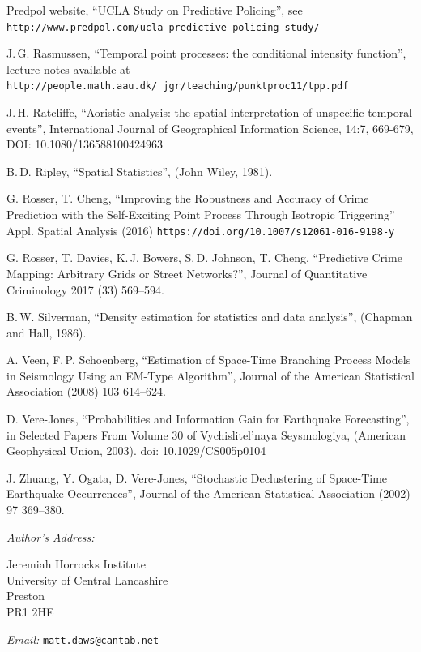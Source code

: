 \documentclass[twoside,a4paper]{article}
\theoremstyle{plain}
\theoremstyle{definition}
\begin{document}
\begin{thebibliography}{99}
 Predpol website, ``UCLA Study on Predictive Policing'',
	see \texttt{http://www.predpol.com/ucla-predictive-policing-study/}

 J.\,G. Rasmussen,
	``Temporal point processes: the conditional intensity function'',
	lecture notes available at \texttt{http://people.math.aau.dk/~jgr/teaching/punktproc11/tpp.pdf}

 J.\,H. Ratcliffe, ``Aoristic analysis: the spatial interpretation of unspecific
temporal events'', International Journal of Geographical Information Science, 14:7, 669-679, DOI:
10.1080/136588100424963

 B.\,D. Ripley,
	``Spatial Statistics'',
	(John Wiley, 1981).

 G. Rosser, T. Cheng, ``Improving the Robustness and Accuracy of Crime
	Prediction with the Self-Exciting Point Process Through Isotropic Triggering''
	Appl. Spatial Analysis (2016) \texttt{https://doi.org/10.1007/s12061-016-9198-y}

 G. Rosser, T. Davies, K.\,J. Bowers, S.\,D. Johnson, T. Cheng,
	``Predictive Crime Mapping: Arbitrary Grids or Street Networks?'',
	Journal of Quantitative Criminology 2017 (33) 569--594.

 B.\,W. Silverman,
	``Density estimation for statistics and data analysis'',
	(Chapman and Hall, 1986).

 A. Veen, F.\,P. Schoenberg,
	``Estimation of Space-Time Branching Process Models in Seismology Using an EM-Type Algorithm'',
	Journal of the American Statistical Association (2008) 103 614--624.

 D. Vere-Jones,
	``Probabilities and Information Gain for Earthquake Forecasting'',
	in Selected Papers From Volume 30 of Vychislitel'naya Seysmologiya,
	(American Geophysical Union, 2003).  doi: 10.1029/CS005p0104

 J. Zhuang, Y. Ogata, D. Vere-Jones,
	``Stochastic Declustering of Space-Time Earthquake Occurrences'',
	Journal of the American Statistical Association (2002) 97 369--380.

\end{thebibliography}


\vspace{5ex}

\noindent\emph{Author's Address:}
\parbox[t]{3in}{Jeremiah Horrocks Institute\\
University of Central Lancashire\\
Preston\\
PR1 2HE}

\bigskip\noindent\emph{Email:} \texttt{matt.daws@cantab.net}
\end{document}

